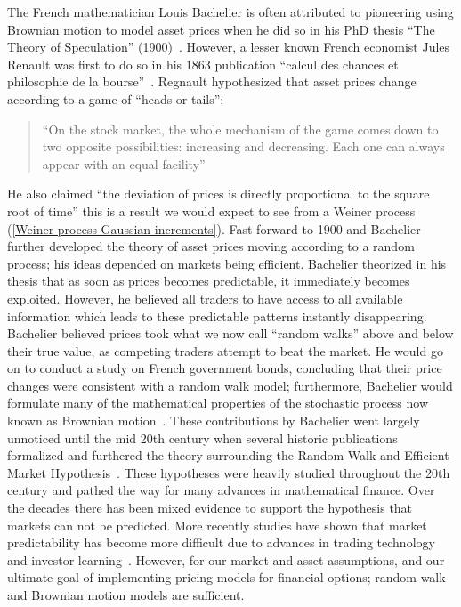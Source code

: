 The French mathematician Louis Bachelier is often attributed to pioneering using Brownian motion to model asset prices when he did so in his PhD thesis “The Theory of Speculation'' (1900)~\cite{Bachelier+2007}. However, a lesser known French economist Jules Renault was first to do so in his 1863 publication “calcul des chances et philosophie de la bourse''~\cite{RegnaultFirst}.
\nline{}
Regnault hypothesized that asset prices change according to a game of ``heads or tails'':
\begin{quotation}
    ``On the stock market, the whole mechanism of the game comes down to two opposite possibilities: increasing and decreasing. Each one can always appear with an equal facility'' \hfill{}\nolinebreak\cite{regnault1863calcul,RegnaultFirst}
\end{quotation}
He also claimed ``the deviation of prices is directly proportional to the square root of time'' this is a result we would expect to see from a Weiner process (\autoref{Weiner process Gaussian increments}). Fast-forward to 1900 and Bachelier further developed the theory of asset prices moving according to a random process; his ideas depended on markets being efficient. Bachelier theorized in his thesis that as soon as prices becomes predictable, it immediately becomes exploited. However, he believed all traders to have access to all available information which leads to these predictable patterns instantly disappearing. Bachelier believed prices took what we now call ``random walks'' above and below their true value, as competing traders attempt to beat the market. He would go on to conduct a study on French government bonds, concluding that their price changes were consistent with a random walk model; furthermore, Bachelier would formulate many of the mathematical properties of the stochastic process now known as Brownian motion~\cite{Bachelier+2007}.
\nline{}
These contributions by Bachelier went largely unnoticed until the mid 20th century when several historic publications formalized and furthered the theory surrounding the Random-Walk and Efficient-Market Hypothesis~\cite{Maurice_Kendall_RandomWalk, cootner1964random, RandomWalkFama}. These hypotheses were heavily studied throughout the 20th century and pathed the way for many advances in mathematical finance. Over the decades there has been mixed evidence to support the hypothesis that markets can not be predicted. More recently studies have shown that market predictability has become more difficult due to advances in trading technology and investor learning~\cite{welch2008comprehensive,mclean2016does}. However, for our market and asset assumptions, and our ultimate goal of implementing pricing models for financial options; random walk and Brownian motion models are sufficient.
